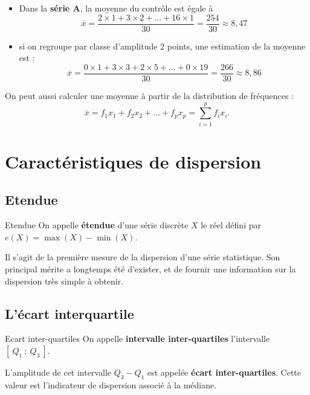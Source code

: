 \documentclass[10pt,a4paper,openany,twoside, eleve]{book}
\begin{document}
\begin{ex}{}{}
   \begin{itemize}
     \item  Dans la \textbf{série A}, la moyenne du contrôle est égale à $$\overline{x} =\dfrac{2\times1+3\times2+\dots+16\times1}{30} =\dfrac{254}{30} \approx 8,47$$
     \item  si on regroupe par classe d'amplitude $2$ points, une estimation de la moyenne est : $$\overline{x} = \dfrac{0\times1+3\times3+2\times5+\dots+0\times19}{30} =\dfrac{266}{30}\approx 8,86$$
   \end{itemize}
\end{ex}

\begin{rem}{}{}
   On peut aussi calculer une moyenne à partir de la distribution de fréquences : $$\overline{x} =f_1x_1+f_2x_2+\dots +f_px_p =\sum_{i=1}^p f_ix_i.$$
\end{rem}

\section{Caractéristiques de dispersion}

\subsection{Etendue}
\begin{defi}{Etendue}{}
On appelle \textbf{étendue} d'une série discrète $X$ le réel défini par $e(X)=\max(X)-\min(X)$.
\end{defi}
\medskip

Il s'agit de la première mesure de la dispersion d'une série statistique. Son principal mérite a longtemps été d'exister, et de fournir une information sur la dispersion très simple à obtenir.


\subsection{L'écart interquartile}

\begin{defi}{Ecart inter-quartiles}{}
On appelle \textbf{intervalle inter-quartiles} l'intervalle $[~Q_1~;~Q_3~]$.

\noindent L'amplitude de cet intervalle $Q_3-Q_1$ est appelée \textbf{écart inter-quartiles}. Cette valeur est l'indicateur de dispersion associé à la médiane.
\end{defi}
\end{document}
